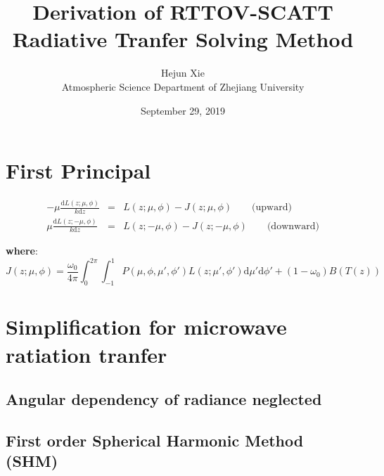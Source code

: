 \documentclass[a4paper]{report}
\begin{document}
\newcommand{\ud}{\mathrm{d}}
\newcommand{\oops}[1]{\textbf{#1}}

\title{Derivation of RTTOV-SCATT Radiative Tranfer Solving Method}
\author{Hejun Xie\\
Atmospheric Science Department of Zhejiang University}
\date{September 29, 2019}
\maketitle

\newpage

\chapter{First Principal}

\begin{eqnarray} \label{eq:1}
-\mu \frac{\ud L(z; \mu, \phi)}{k \ud z} & = & 
L(z; \mu, \phi) - J(z; \mu, \phi) \qquad \textrm{(upward)} \\
\mu \frac{\ud L(z; -\mu, \phi)}{k \ud z} & = & 
L(z; -\mu, \phi) - J(z; -\mu, \phi) \qquad \textrm{(downward)}
\end{eqnarray}

\oops{where}:
\begin{equation} \label{eq:2}
    J(z; \mu, \phi) = 
    \frac{\omega_{0}}{4\pi}\int_{0}^{2\pi}\!\!\!\int_{-1}^{1}
    P(\mu, \phi, \mu', \phi')L(z;\mu',\phi')\ud\mu'\ud\phi'
    + (1-\omega_{0})B(T(z))
\end{equation}



\chapter{Simplification for microwave ratiation tranfer}
\section{Angular dependency of radiance neglected}
\section{First order Spherical Harmonic Method (SHM)}

\end{document}
